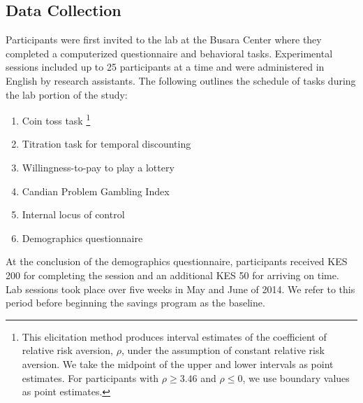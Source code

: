\documentclass[11pt]{article}
\begin{document}

	\subsection{Data Collection}

		Participants were first invited to the lab at the Busara Center where they completed a computerized questionnaire and behavioral tasks. Experimental sessions included up to 25 participants at a time and were administered in English by research assistants. The following outlines the schedule of tasks during the lab portion of the study:

		\begin{enumerate} \setlength{\itemsep}{1pt}
		\item Coin toss task \parencite{eckel_sex_2002}\footnote{This elicitation method produces interval estimates of the coefficient of relative risk aversion, $\rho$, under the assumption of constant relative risk aversion. We take the midpoint of the upper and lower intervals as point estimates. For participants with $\rho \geq 3.46$ and $\rho \leq 0$, we use boundary values as point estimates.}
		\item Titration task for temporal discounting \parencite{cornsweet_staircase-method_1962}
		\item Willingness-to-pay to play a lottery
		\item Candian Problem Gambling Index \parencite{ferris_canadian_2001}
		\item Internal locus of control \parencite{rotter_generalized_1966}
		\item Demographics questionnaire
		\end{enumerate}


		At the conclusion of the demographics questionnaire, participants received KES 200 for completing the session and an additional KES 50 for arriving on time. Lab sessions took place over five weeks in May and June of 2014. We refer to this period before beginning the savings program as the baseline.
\end{document}
